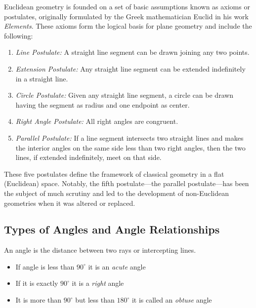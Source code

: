 Euclidean geometry is founded on a set of basic assumptions known as axioms or postulates, originally 
formulated by the Greek mathematician Euclid in his work \textit{Elements}. These axioms form the logical 
basis for plane geometry and include the following:

\begin{enumerate}[label=\Roman*.]

	\item \emph{Line Postulate:} A straight line segment can be drawn joining any two points.
    
    \item \emph{Extension Postulate:} Any straight line segment can be extended indefinitely in a straight 
			line.
    
    \item \emph{Circle Postulate:} Given any straight line segment, a circle can be drawn having the 
		   segment as radius and one endpoint as center.
    
    \item \emph{Right Angle Postulate:} All right angles are congruent.
    
    \item \emph{Parallel Postulate:} If a line segment intersects two straight lines and makes the interior  
	      angles on the same side less than two right angles, then the two lines, if extended indefinitely, 
		  meet on that side.

\end{enumerate}

These five postulates define the framework of classical geometry in a flat (Euclidean) space. Notably, 
the fifth postulate—the parallel postulate—has been the subject of much scrutiny and led to the 
development of non-Euclidean geometries when it was altered or replaced.

\subsection{Types of Angles and Angle Relationships}

An angle is the distance between two rays or intercepting lines.

\begin{itemize}

	\item If angle is less than \(90^\circ\) it is an \emph{acute} angle

	\item If it is exactly \(90^\circ\) it is a \emph{right} angle

	\item It is more than \(90^\circ\) but less than \(180^\circ\) it is called an \emph{obtuse} angle

\end{itemize}

